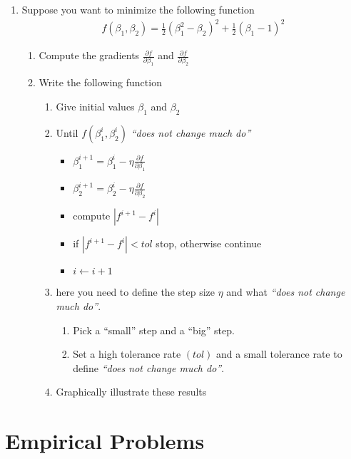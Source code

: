 \documentclass[12pt,onecolumn]{article}
\begin{document}
\begin{enumerate}
  \item  Suppose you want to minimize the following function 
  \begin{align}
  f(\beta_1,\beta_2)=\frac{1}{2}(\beta_1^2-\beta_2)^2+ \frac{1}{2}(\beta_1-1)^2
  \end{align}
  \begin{enumerate}
    \item Compute the gradients $\frac{\partial f}{\partial \beta_1}$ and $\frac{\partial f}{\partial \beta_2}$
    \item Write the following function
    \begin{enumerate}
      \item Give initial values $\beta_1$ and $\beta_2$
      \item Until $f(\beta^i_1,\beta^i_2)$ {\it ``does not change much do''}
      \begin{itemize}
       \item $\beta_1^{i+1} = \beta_1^{i} - \eta \frac{\partial f}{\partial \beta_1}$
       \item $\beta_2^{i+1} = \beta_2^{i} - \eta \frac{\partial f}{\partial \beta_2}$
       \item compute $|f^{i+1}-f^{i}|$
       \item if $|f^{i+1}-f^{i}|<tol$ stop, otherwise continue
       \item $i \leftarrow i+1$
      \end{itemize}
      \item here you need to define the step size $\eta$ and what {\it ``does not change much do''}. 
      \begin{enumerate}
        \item Pick a ``small'' step and a ``big'' step. 
        \item Set a high tolerance rate $(tol)$ and a small tolerance rate to define {\it ``does not change much do''}. 
      \end{enumerate}
      \item Graphically illustrate these results
    \end{enumerate}
  \end{enumerate}
        



  

\end{enumerate}



\section{Empirical Problems}
\end{document}
